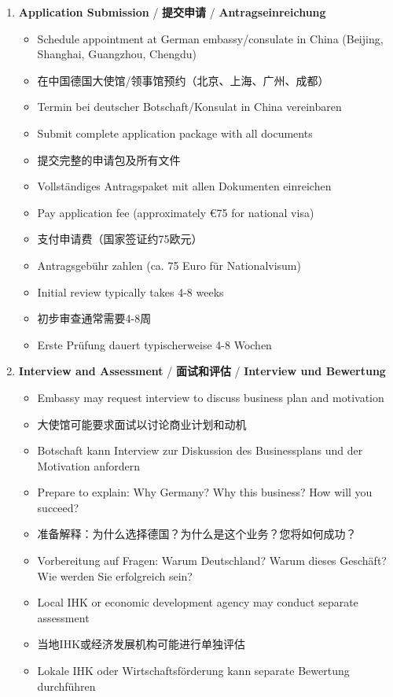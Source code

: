 \begin{enumerate}
    \item \textbf{Application Submission} / \textbf{提交申请} / \textbf{Antragseinreichung}
    \begin{itemize}
        \item Schedule appointment at German embassy/consulate in China (Beijing, Shanghai, Guangzhou, Chengdu)
        \item 在中国德国大使馆/领事馆预约（北京、上海、广州、成都）
        \item Termin bei deutscher Botschaft/Konsulat in China vereinbaren
        \item Submit complete application package with all documents
        \item 提交完整的申请包及所有文件
        \item Vollständiges Antragspaket mit allen Dokumenten einreichen
        \item Pay application fee (approximately €75 for national visa)
        \item 支付申请费（国家签证约75欧元）
        \item Antragsgebühr zahlen (ca. 75 Euro für Nationalvisum)
        \item Initial review typically takes 4-8 weeks
        \item 初步审查通常需要4-8周
        \item Erste Prüfung dauert typischerweise 4-8 Wochen
    \end{itemize}
    
    \item \textbf{Interview and Assessment} / \textbf{面试和评估} / \textbf{Interview und Bewertung}
    \begin{itemize}
        \item Embassy may request interview to discuss business plan and motivation
        \item 大使馆可能要求面试以讨论商业计划和动机
        \item Botschaft kann Interview zur Diskussion des Businessplans und der Motivation anfordern
        \item Prepare to explain: Why Germany? Why this business? How will you succeed?
        \item 准备解释：为什么选择德国？为什么是这个业务？您将如何成功？
        \item Vorbereitung auf Fragen: Warum Deutschland? Warum dieses Geschäft? Wie werden Sie erfolgreich sein?
        \item Local IHK or economic development agency may conduct separate assessment
        \item 当地IHK或经济发展机构可能进行单独评估
        \item Lokale IHK oder Wirtschaftsförderung kann separate Bewertung durchführen
    \end{itemize}
    

\end{enumerate}
